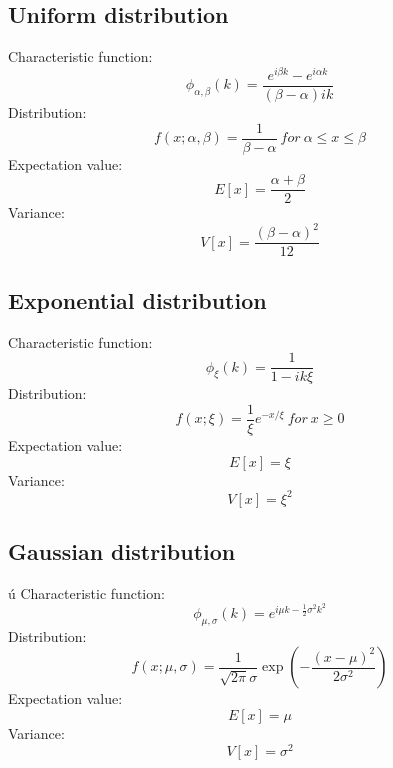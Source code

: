 \documentclass[12pt]{book}
\begin{document}
\subsection{Uniform distribution}
Characteristic function:
\begin{equation}
	\phi_{\alpha,\beta}(k)=\frac{e^{i\beta k}-e^{i\alpha k}}{\left(\beta-\alpha\right)ik}
\end{equation}
Distribution:
\begin{equation}
	f(x;\alpha,\beta) = \frac{1}{\beta-\alpha} \ for \ \alpha \leq x \leq \beta 
\end{equation}
Expectation value:
\begin{equation}
	E[x] = \frac{\alpha + \beta}{2}
\end{equation}
Variance:
\begin{equation}
	V[x] = \frac{(\beta - \alpha)^2}{12}
\end{equation}
\subsection{Exponential distribution}
Characteristic function:
\begin{equation}
	\phi_\xi(k)=\frac{1}{1-ik\xi}
\end{equation}
Distribution:
\begin{equation}
	f(x;\xi) = \frac{1}{\xi}e^{-x/\xi} \ for \ x \geq 0
\end{equation}
Expectation value:
\begin{equation}
	E[x] = \xi
\end{equation}
Variance:
\begin{equation}
	V[x] = \xi^2
\end{equation}
\subsection{Gaussian distribution}\'u
Characteristic function:
\begin{equation}
	\phi_{\mu,\sigma}(k)=e^{i\mu k-\frac{1}{2}\sigma^2k^2}
\end{equation}
Distribution:
\begin{equation}
	f(x;\mu,\sigma) = \frac{1}{\sqrt{2\pi}\sigma}\exp\left(-\frac{(x-\mu)^2}{2\sigma^2}\right)
\end{equation}
Expectation value:
\begin{equation}
	E[x] = \mu
\end{equation}
Variance:
\begin{equation}
	V[x] = \sigma^2
\end{equation}
\end{document}

